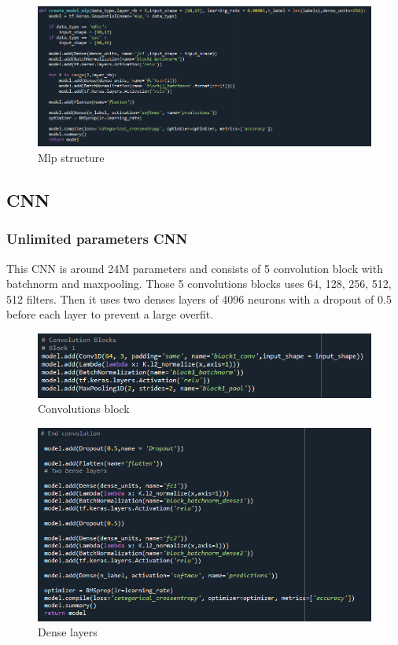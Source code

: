 \begin{figure}[h!]
    \centering
    \includegraphics[width=1\textwidth]{chapters/pictures/mlp.PNG}
    \caption{Mlp structure}
    \label{fig:mlp}
\end{figure}

\subsection{CNN}
\subsubsection{Unlimited parameters CNN}

This CNN is around 24M parameters and consists of 5 convolution block with batchnorm and maxpooling. Those 5 convolutions blocks uses 64, 128, 256, 512, 512 filters. Then it uses two denses layers of 4096 neurons with a dropout of 0.5 before each layer to prevent a large overfit.

\begin{figure}[h!]
    \centering
    \includegraphics[width=1\textwidth]{chapters/pictures/cnn_block.PNG}
    \caption{Convolutions block}
    \label{fig:cnn_block}
\end{figure}




\begin{figure}[h!]
    \centering
    \includegraphics[width=1\textwidth]{chapters/pictures/cnn_end.PNG}
    \caption{Dense layers}
    \label{fig:cnn_end}
\end{figure}

